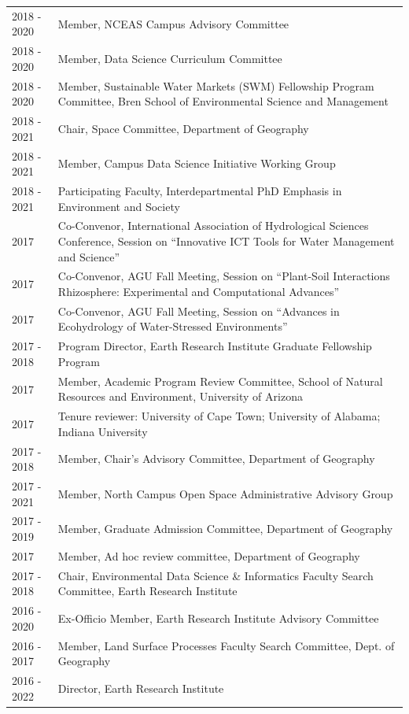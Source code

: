 \begin{longtable}{l p{5.5in}}
2018 - 2020 & Member, NCEAS Campus Advisory Committee \\
2018 - 2020 & Member, Data Science Curriculum Committee \\
2018 - 2020 & Member, Sustainable Water Markets (SWM) Fellowship Program Committee, Bren School of Environmental Science and Management \\
2018 - 2021 & Chair, Space Committee, Department of Geography \\
2018 - 2021 & Member, Campus Data Science Initiative Working Group \\
2018 - 2021 & Participating Faculty, Interdepartmental PhD Emphasis in Environment and Society \\
2017 & Co-Convenor, International Association of Hydrological Sciences Conference, Session on ``Innovative ICT Tools for Water Management and Science'' \\
2017 & Co-Convenor, AGU Fall Meeting, Session on ``Plant-Soil Interactions Rhizosphere: Experimental and Computational Advances'' \\
2017 & Co-Convenor, AGU Fall Meeting, Session on ``Advances in Ecohydrology of Water-Stressed Environments'' \\
2017 - 2018 & Program Director, Earth Research Institute Graduate Fellowship Program \\
2017 & Member, Academic Program Review Committee, School of Natural Resources and Environment, University of Arizona \\
2017 & Tenure reviewer: University of Cape Town; University of Alabama; Indiana University \\
2017 - 2018 & Member, Chair's Advisory Committee, Department of Geography \\
2017 - 2021 & Member, North Campus Open Space Administrative Advisory Group \\
2017 - 2019 & Member, Graduate Admission Committee, Department of Geography \\
2017 & Member, Ad hoc review committee, Department of Geography \\
2017 - 2018 & Chair, Environmental Data Science \& Informatics Faculty Search Committee, Earth Research Institute \\
2016 - 2020 & Ex-Officio Member, Earth Research Institute Advisory Committee \\
2016 - 2017 & Member, Land Surface Processes Faculty Search Committee, Dept. of Geography \\
2016 - 2022 & Director, Earth Research Institute \\

\end{longtable}
